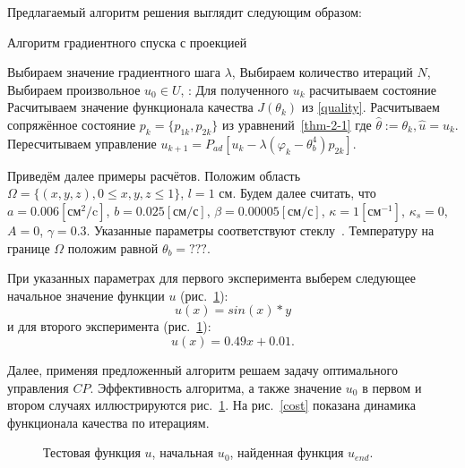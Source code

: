 \documentclass[10pt]{article}
\begin{document}
    Предлагаемый алгоритм решения выглядит следующим образом:
    \begin{algorithm}[H]
        \caption{Алгоритм градиентного спуска с проекцией}
        \begin{algorithmic}[1]
            \State Выбираем значение градиентного шага $\lambda$,
            \State Выбираем количество итераций $N$,
            \State Выбираем произвольное $u_0 \in U$,
            :
            \State Для полученного $u_k$ расчитываем состояние
            \State Расчитываем значение функционала качества $J(\theta_k)$ из \eqref{quality}.
            \State Расчитываем сопряжённое состояние $p_k=\{p_{1k},p_{2k}\}$ из
            уравнений~\eqref{thm-2-1} где $ \hat{\theta} := \theta_k, \hat{u}=u_k$.
            \State Пересчитываем управление
            $u_{k+1} = P_{ad}\left[ u_k - \lambda (\varphi_k - \theta_b^4)p_{2k} \right]$.
            \EndFor
        \end{algorithmic}
    \end{algorithm}
    Приведём далее примеры расчётов.
    Положим область $\Omega = \{(x, y, z), 0 \leq x, y, z \leq 1\}$, $l = 1$ см.
    Будем далее считать, что $a = 0.006[\text{см}^2/\text{c}]$, $b=0.025[\text{см}/\text{с}]$,
    $\beta = 0.00005[\text{см}/\text{с}]$, $\kappa=1[\text{см}^{-1}]$, $\kappa_s = 0$, $A = 0$,
    $\gamma = 0.3$.
    Указанные параметры соответствуют стеклу~\cite{grenkin_13}.
    Температуру на границе $\Omega$ положим равной $\theta_b = ???$.

    При указанных параметрах для первого эксперимента выберем следующее начальное значение
    функции $u$ (рис.~\ref{control}):
    \begin{equation}
        \label{test_function_1}
        u(x)= sin(x) * y
    \end{equation}
    и для второго эксперимента (рис.~\ref{control}):
    \begin{equation}
        \label{test_function_2}
        u(x)=0.49x+0.01.
    \end{equation}

    Далее, применяя предложенный алгоритм решаем задачу оптимального управления $CP$.
    Эффективность алгоритма, а также значение $u_0$
    в первом и втором случаях иллюстрируются рис.~\ref{control}.
    На рис.~\ref{cost} показана динамика функционала качества по итерациям.

    \begin{figure}[H]
        \centering
        \caption{Тестовая функция $u$, начальная $u_0$, найденная функция $u_{end}.$}
        \label{control}
    \end{figure}
\end{document}
